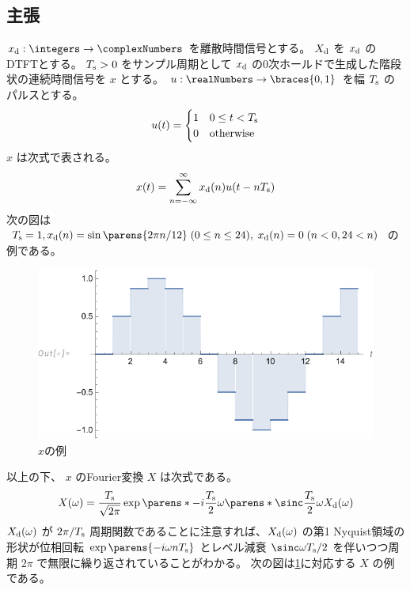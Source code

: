         \subsection{主張}
            $\xd:\integers\to\complexNumbers$ を離散時間信号とする。
            $X_\text{d}$ を $x_\text{d}$ のDTFTとする。
            $T_\text{s}>0$ をサンプル周期として $x_\text{d}$ の0次ホールドで生成した階段状の連続時間信号を $x$ とする。
            $u:\realNumbers\to\braces{0,1}$ を幅 $T_\text{s}$ のパルスとする。
            \[
                u(t) = \begin{cases}
                    1 & 0\leq t < T_\text{s} \\
                    0 & \text{otherwise}
                \end{cases}
            \]
            $x$ は次式で表される。
            \[ x(t) = \sum_{n=-\infty}^\infty x_\text{d}(n)u(t-nT_\text{s}) \]
            次の図は $\Ts=1,\xd(n) = \sin\parens{2\pi n/12}\;(0\leq n\leq 24),\;\xd(n) = 0\;(n<0,24<n)$ の例である。
            \begin{figure}[H]
                \centering
                \includegraphics[keepaspectratio, scale=0.8]
                {parts/time-discretization/chapters/up-sampling/imgs/x1.pdf}
                \caption{$x$の例}
                \label{離散時間信号のDAC出力の例}
            \end{figure}
            以上の下、 $x$ のFourier変換 $X$ は次式である。
            \[ X(\omega) = \frac{\Ts}{\sqrt{2\pi}}\exp\parens*{-i\frac{\Ts}{2}\omega}\parens*{\sinc \frac{\Ts}{2}\omega}\Xd(\omega) \]
            $X_\text{d}(\omega)$ が $2\pi/T_\text{s}$ 周期関数であることに注意すれば、$X_\text{d}(\omega)$ の第1 Nyquist領域の形状が位相回転 $\exp\parens{-i \omega n\Ts}$ とレベル減衰 $\sinc\omega\Ts/2$ を伴いつつ周期 $2\pi$ で無限に繰り返されていることがわかる。
            次の図は\ref{離散時間信号のDAC出力の例}に対応する $X$ の例である。
